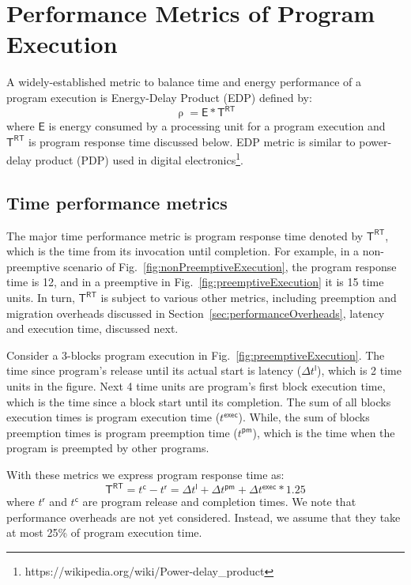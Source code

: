 \chapter{Performance Metrics of Program Execution}
\label{chap:efficiencyMetrics}

A widely-established metric to balance time and energy performance of a program execution is Energy-Delay Product (EDP) \cite{Venkat2014, Ratkovic2015, Kumar2003, Gonzalez1996} defined by:
%
\begin{equation}
\uprho = \mathsf{E} * \mathsf{T}^\mathsf{RT}
\end{equation}
%
where $\mathsf{E}$ is energy consumed by a processing unit for a program execution and $\mathsf{T}^\mathsf{RT}$ is program response time discussed below. EDP metric is similar to power-delay product (PDP) used in digital electronics\footnote{https://wikipedia.org/wiki/Power-delay\_product}.

\section{Time performance metrics}
\label{sec:timePerformanceMetrics}

The major time performance metric is program response time denoted by $\mathsf{T}^\mathsf{RT}$, which is the time from its invocation until completion. For example, in a non-preemptive scenario of Fig.~\ref{fig:nonPreemptiveExecution}, the program response time is 12, and in a preemptive in Fig.~\ref{fig:preemptiveExecution} it is 15 time units. In turn, $\mathsf{T}^\mathsf{RT}$ is subject to various other metrics, including preemption and migration overheads discussed in Section~\ref{sec:performanceOverheads}, latency and execution time, discussed next.

Consider a 3-blocks program execution in Fig.~\ref{fig:preemptiveExecution}. 
The time since program's release until its actual start is latency ($\Delta t^{\mathsf{l}}$), which is 2 time units in the figure. Next 4 time units are program's first block execution time, which is the time since a block start until its completion. The sum of all blocks execution times is program execution time ($t^{\mathsf{exec}}$). While, the sum of blocks preemption times is program preemption time ($t^{\mathsf{pm}}$), which is the time when the program is preempted by other programs. 

With these metrics we express program response time as:
%
\begin{equation}
\mathsf{T}^\mathsf{RT}=t^\mathsf{c}-t^\mathsf{r}=\Delta t^\mathsf{l}+\Delta t^\mathsf{pm}+\Delta t^\mathsf{exec}*1.25
\end{equation}
%
where $t^\mathsf{r}$ and $t^\mathsf{c}$ are program release and completion times.
We note that performance overheads are not yet considered. Instead, we assume that they take at most 25\% of program execution time.

